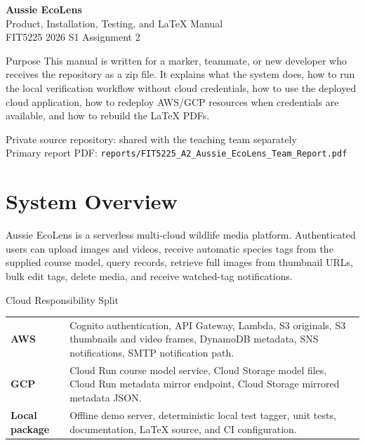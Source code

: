 \documentclass[12pt,a4paper]{article}
\begin{document}
\begin{titlepage}
\vspace*{22mm}
{\fontsize{32}{36}\selectfont\bfseries\textcolor{EcoGreen}{Aussie EcoLens}}\\[3mm]
{\Large Product, Installation, Testing, and LaTeX Manual}\\[4mm]
{\large FIT5225 2026 S1 Assignment 2}\\[10mm]

\begin{manualbox}{Purpose}
This manual is written for a marker, teammate, or new developer who receives the repository as a zip file. It explains what the system does, how to run the local verification workflow without cloud credentials, how to use the deployed cloud application, how to redeploy AWS/GCP resources when credentials are available, and how to rebuild the LaTeX PDFs.
\end{manualbox}

\vfill
Private source repository: shared with the teaching team separately\\
Primary report PDF: \texttt{reports/FIT5225\_A2\_Aussie\_EcoLens\_Team\_Report.pdf}
\end{titlepage}

\tableofcontents
\newpage

\section{System Overview}
Aussie EcoLens is a serverless multi-cloud wildlife media platform. Authenticated users can upload images and videos, receive automatic species tags from the supplied course model, query records, retrieve full images from thumbnail URLs, bulk edit tags, delete media, and receive watched-tag notifications.

\begin{manualbox}{Cloud Responsibility Split}
\begin{tabularx}{\textwidth}{>{\bfseries}p{33mm}X}
AWS & Cognito authentication, API Gateway, Lambda, S3 originals, S3 thumbnails and video frames, DynamoDB metadata, SNS notifications, SMTP notification path.\\
GCP & Cloud Run course model service, Cloud Storage model files, Cloud Run metadata mirror endpoint, Cloud Storage mirrored metadata JSON.\\
Local package & Offline demo server, deterministic local test tagger, unit tests, documentation, LaTeX source, and CI configuration.\\
\end{tabularx}
\end{manualbox}
\end{document}
